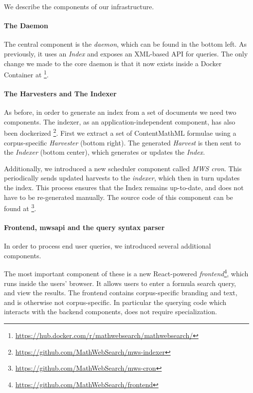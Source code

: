 We describe the components of our infrastructure. 

\paragraph{The \MWS Daemon}
The central component is the \textit{\MWS daemon}, which can be found in the bottom left. 
As previously, it uses an \textit{Index} and exposes an XML-based API for queries. 
The only change we made to the core daemon is that it now exists inside a Docker Container at \footnote{\url{https://hub.docker.com/r/mathwebsearch/mathwebsearch/}}. 

\paragraph{The Harvesters and The Indexer}
As before, in order to generate an index from a set of documents we need two components. 
The indexer, as an application-independent component, has also been dockerized \footnote{\url{https://github.com/MathWebSearch/mws-indexer}}. 
First we extract a set of ContentMathML formulae using a corpus-specific \textit{Harvester} (bottom right). 
The generated \textit{Harvest} is then sent to the \textit{Indexer} (bottom center), which generates or updates the \textit{Index}. 

Additionally, we introduced a new scheduler component called \textit{MWS cron}. 
This periodically sends updated harvests to the \textit{indexer}, which then in turn updates the index. 
This process ensures that the Index remains up-to-date, and does not have to be re-generated manually. 
The source code of this component can be found at \footnote{\url{https://github.com/MathWebSearch/mws-cron}}. 

\paragraph{Frontend, mwsapi and the query syntax parser}

In order to process end user queries, we introduced several additional components.

The most important component of these is a new React-powered \textit{frontend}\footnote{\url{https://github.com/MathWebSearch/frontend}}, which runs inside the users' browser. 
It allows users to enter a formula search query, and view the results. 
The frontend contains corpus-specific branding and text, and is otherwise not corpus-specific. 
In particular the querying code which interacts with the backend components, does not require specialization. 

